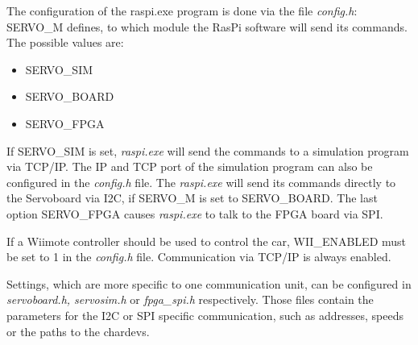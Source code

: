 \documentclass[a4paper
               ,10pt
               ,DIV=10 %
               ,BCOR=0.3cm
               ,pagesize %
               ,headings=small
               ,bibtotoc
               ]
               {scrartcl}
\begin{document}
The configuration of the raspi.exe program is done via the file \textit{config.h}:
SERVO\_M defines, to which module the RasPi software will send its commands. The possible values are:
\begin{itemize}
\item{SERVO\_SIM}
\item{SERVO\_BOARD}
\item{SERVO\_FPGA}
\end{itemize}

If SERVO\_SIM is set, \textit{raspi.exe} will send the commands to a simulation program via TCP/IP.
The IP and TCP port of the simulation program can also be configured in the \textit{config.h} file.
The \textit{raspi.exe} will send its commands directly to the Servoboard via I2C, if SERVO\_M is set to SERVO\_BOARD.
The last option SERVO\_FPGA causes \textit{raspi.exe} to talk to the FPGA board via SPI.

If a Wiimote controller should be used to control the car, WII\_ENABLED must be set to 1 in the \textit{config.h} file.
Communication via TCP/IP is always enabled.

Settings, which are more specific to one communication unit, can be configured in \textit{servoboard.h, servosim.h} or \textit{fpga\_spi.h} respectively. Those files contain the parameters for the I2C or SPI specific communication, such as addresses, speeds or the paths to the chardevs.
\end{document}
